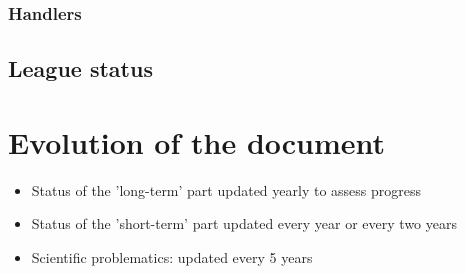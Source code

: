 \documentclass{article}
\begin{document}

\subsubsection{Handlers}

\subsection{League status}
\begin{sidewaysfigure}

\end{sidewaysfigure}


\section{Evolution of the document}

\begin{itemize}
\item Status of the 'long-term' part updated yearly to assess progress
\item Status of the 'short-term' part updated every year or every two years
\item Scientific problematics: updated every 5 years
\end{itemize}


\newpage

\printbibliography
\end{document}
